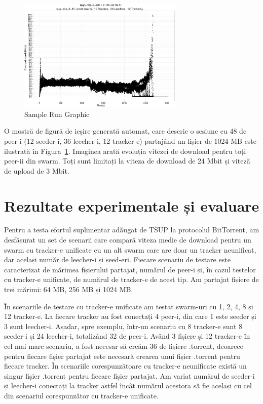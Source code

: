 \begin{figure}[h]
  \begin{center}
    \includegraphics[width=0.7\textwidth]{src/img/unified-tracker/tsup-sample-run-48peers}
  \end{center}
  \caption{Sample Run Graphic}
  \label{fig:unified-tracker:tsup-sample-run}
\end{figure}

O mostră de figură de ieșire generată automat, care descrie o sesiune cu 48 de peer-i (12 seeder-i, 36 leecher-i, 12 tracker-e) partajând un fișier de 1024 MB este ilustrată în Figura~\ref{fig:unified-tracker:tsup-sample-run}. Imaginea arată evoluția vitezei de download pentru toți peer-ii din swarm. Toți sunt limitați la viteza de download de 24 Mbit și viteză de upload de 3 Mbit.

\section{Rezultate experimentale și evaluare}
\label{sec:unified-tracker:results}

Pentru a testa efortul suplimentar adăugat de TSUP la protocolul BitTorrent, am desfășurat un set de scenarii care compară viteza medie de download pentru un swarm cu tracker-e unificate cu un alt swarm care are doar un tracker neunificat, dar același număr de leecher-i și seed-eri. Fiecare scenariu de testare este caracterizat de mărimea fișierului partajat, numărul de peer-i și, în cazul testelor cu tracker-e unificate, de numărul de tracker-e de acest tip. Am partajat fișiere de trei mărimi: 64 MB, 256 MB și 1024 MB.

În scenariile de testare cu tracker-e unificate am testat swarm-uri cu 1, 2, 4, 8 și 12 tracker-e. La fiecare tracker au fost conectați 4 peer-i, din care 1 este seeder și 3 sunt leecher-i. Așadar, spre exemplu, într-un scenariu cu 8 tracker-e sunt 8 seeder-i și 24 leecher-i, totalizând 32 de peer-i. Având 3 fișiere și 12 tracker-e în cel mai mare scenariu, a fost necesar să creăm 36 de fișiere .torrent, deoarece pentru fiecare fișier partajat este necesară crearea unui fișier .torrent pentru fiecare tracker. În scenariile corespunzătoare cu tracker-e neunificate există un singur fișier .torrent pentru fiecare fișier partajat. Am variat numărul de seeder-i și leecher-i conectați la tracker astfel încât numărul acestora să fie același cu cel din scenariul corespunzător cu tracker-e unificate.


